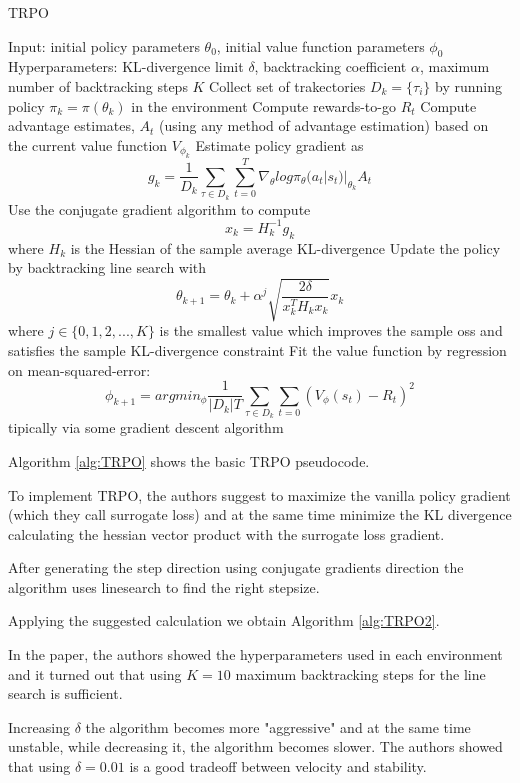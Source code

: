 \documentclass[12pt,a4paper]{article}
\begin{document}
\begin{algorithm}[H]
    \caption{TRPO}
\begin{algorithmic}[1]
\STATE Input: initial policy parameters $\theta_0$, initial value function parameters $\phi_0$
\STATE Hyperparameters: KL-divergence limit $\delta$, backtracking coefficient $\alpha$, maximum number of backtracking steps $K$
    \STATE Collect set of trakectories $D_k = \{\tau_i\}$ by running policy $\pi_k = \pi(\theta_k)$ in the environment
    \STATE Compute rewards-to-go $R_t$
    \STATE Compute advantage estimates, $A_t$ (using any method of advantage estimation) based on the current value function $V_{\phi_k}$
    \STATE Estimate policy gradient as
    $$ g_k = \frac{1}{D_k} \sum_{\tau \in D_k} \sum_{t=0}^T \nabla_{\theta} log \pi_\theta(a_t|s_t)|_{\theta_k} A_t$$
    \STATE Use the conjugate gradient algorithm to compute
    $$x_k = H^{-1}_k g_k$$
    where $H_k$ is the Hessian of the sample average KL-divergence
    \STATE Update the policy by backtracking line search with
    $$\theta_{k+1} = \theta_k + \alpha^j \sqrt{\frac{2\delta}{x_k^T H_kx_k}}x_k$$
    where $j \in \{0,1,2,...,K\}$ is the smallest value which improves the sample oss and satisfies the sample KL-divergence constraint
    \STATE Fit the value function by regression on mean-squared-error:
    $$\phi_{k+1} = arg min_\phi \frac{1}{|D_k|T}\sum_{\tau \in D_k} \sum_{t=0}(V_\phi(s_t) - R_t)^2$$
    tipically via some gradient descent algorithm
\ENDFOR
\end{algorithmic}
\label{alg:TRPO2}
\end{algorithm}

Algorithm \ref{alg:TRPO} shows the basic TRPO pseudocode. 

To implement TRPO, the authors suggest to maximize the vanilla policy gradient (which they call surrogate loss) and at the same time minimize the KL divergence calculating the hessian vector product with the surrogate loss gradient.

After generating the step direction using conjugate gradients direction the algorithm uses linesearch to find the right stepsize.

Applying the suggested calculation we obtain Algorithm \ref{alg:TRPO2}.

In the paper, the authors showed the hyperparameters used in each environment and it turned out that using $K=10$ maximum backtracking steps for the line search is sufficient.

Increasing $\delta$ the algorithm becomes more "aggressive" and at the same time unstable, while decreasing it, the algorithm becomes slower. The authors showed that using $\delta=0.01$ is a good tradeoff between velocity and stability.
\end{document}
